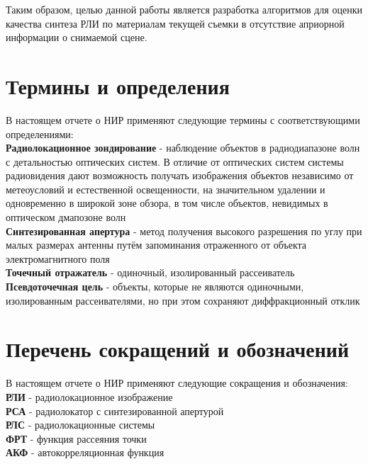 	Таким образом, целью данной работы является разработка алгоритмов для оценки качества синтеза РЛИ по материалам текущей съемки в отсутствие априорной информации о снимаемой сцене.

\section{Термины и определения}
	В настоящем отчете о НИР применяют следующие термины с соответствующими определениями:\\
	\textbf{Радиолокационное зондирование} - наблюдение объектов в радиодиапазоне волн с детальностью оптических систем. В отличие от оптических систем системы радиовидения дают возможность получать изображения объектов независимо от метеоусловий и естественной освещенности, на значительном удалении и одновременно в широкой зоне обзора, в том числе объектов, невидимых в оптическом дмапозоне волн\\	
	\textbf{Синтезированная апертура} - метод получения высокого разрешения по углу при малых размерах антенны путём запоминания отраженного от объекта электромагнитного поля\\
	\textbf{Точечный отражатель} - одиночный, изолированный рассеиватель\\
	\textbf{Псевдоточечная цель} - объекты, которые не являются одиночными, изолированным рассеивателями, но при этом сохраняют диффракционный отклик \\
\section{Перечень сокращений и обозначений}
	В настоящем отчете о НИР применяют следующие сокращения и обозначения:\\	
	\textbf{РЛИ} - радиолокационное изображение\\
	\textbf{РСА} - радиолокатор с синтезированной апертурой\\
	\textbf{РЛС} - радиолокационные системы\\
	\textbf{ФРТ} - функция рассеяния точки\\
	\textbf{АКФ} - автокорреляционная функция\\


\newpage
